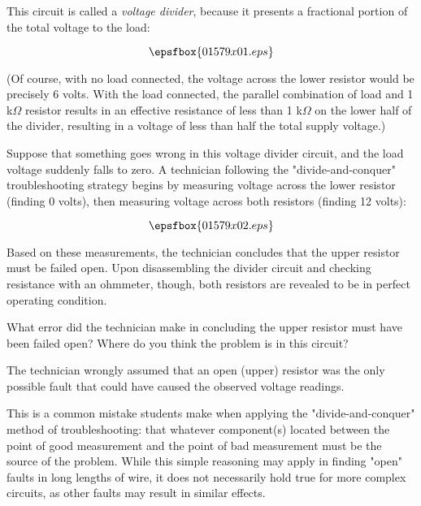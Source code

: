 

This circuit is called a {\it voltage divider}, because it presents a fractional portion of the total voltage to the load:

$$\epsfbox{01579x01.eps}$$

(Of course, with no load connected, the voltage across the lower resistor would be precisely 6 volts.  With the load connected, the parallel combination of load and 1 k$\Omega$ resistor results in an effective resistance of less than 1 k$\Omega$ on the lower half of the divider, resulting in a voltage of less than half the total supply voltage.)

\vskip 10pt

Suppose that something goes wrong in this voltage divider circuit, and the load voltage suddenly falls to zero.  A technician following the "divide-and-conquer" troubleshooting strategy begins by measuring voltage across the lower resistor (finding 0 volts), then measuring voltage across both resistors (finding 12 volts):

$$\epsfbox{01579x02.eps}$$

Based on these measurements, the technician concludes that the upper resistor must be failed open.  Upon disassembling the divider circuit and checking resistance with an ohmmeter, though, both resistors are revealed to be in perfect operating condition.

What error did the technician make in concluding the upper resistor must have been failed open?  Where do you think the problem is in this circuit?







The technician wrongly assumed that an open (upper) resistor was the only possible fault that could have caused the observed voltage readings.  







This is a common mistake students make when applying the "divide-and-conquer" method of troubleshooting: that whatever component(s) located between the point of good measurement and the point of bad measurement must be the source of the problem.  While this simple reasoning may apply in finding "open" faults in long lengths of wire, it does not necessarily hold true for more complex circuits, as other faults may result in similar effects.




